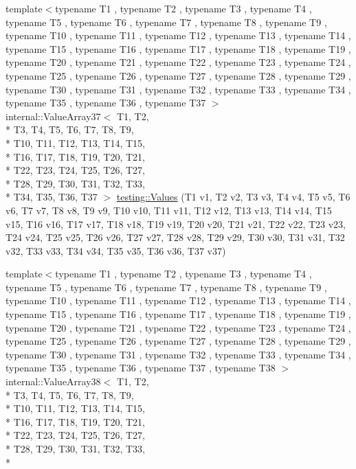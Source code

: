 \begin{DoxyCompactItemize}
\item 
{\footnotesize template$<$typename T1 , typename T2 , typename T3 , typename T4 , typename T5 , typename T6 , typename T7 , typename T8 , typename T9 , typename T10 , typename T11 , typename T12 , typename T13 , typename T14 , typename T15 , typename T16 , typename T17 , typename T18 , typename T19 , typename T20 , typename T21 , typename T22 , typename T23 , typename T24 , typename T25 , typename T26 , typename T27 , typename T28 , typename T29 , typename T30 , typename T31 , typename T32 , typename T33 , typename T34 , typename T35 , typename T36 , typename T37 $>$ }\\internal\-::\-Value\-Array37$<$ T1, T2, \\*
T3, T4, T5, T6, T7, T8, T9, \\*
T10, T11, T12, T13, T14, T15, \\*
T16, T17, T18, T19, T20, T21, \\*
T22, T23, T24, T25, T26, T27, \\*
T28, T29, T30, T31, T32, T33, \\*
T34, T35, T36, T37 $>$ \hyperlink{namespacetesting_aa800bbbe42a44b1776cfd61c9e337ab6}{testing\-::\-Values} (T1 v1, T2 v2, T3 v3, T4 v4, T5 v5, T6 v6, T7 v7, T8 v8, T9 v9, T10 v10, T11 v11, T12 v12, T13 v13, T14 v14, T15 v15, T16 v16, T17 v17, T18 v18, T19 v19, T20 v20, T21 v21, T22 v22, T23 v23, T24 v24, T25 v25, T26 v26, T27 v27, T28 v28, T29 v29, T30 v30, T31 v31, T32 v32, T33 v33, T34 v34, T35 v35, T36 v36, T37 v37)
\item 
{\footnotesize template$<$typename T1 , typename T2 , typename T3 , typename T4 , typename T5 , typename T6 , typename T7 , typename T8 , typename T9 , typename T10 , typename T11 , typename T12 , typename T13 , typename T14 , typename T15 , typename T16 , typename T17 , typename T18 , typename T19 , typename T20 , typename T21 , typename T22 , typename T23 , typename T24 , typename T25 , typename T26 , typename T27 , typename T28 , typename T29 , typename T30 , typename T31 , typename T32 , typename T33 , typename T34 , typename T35 , typename T36 , typename T37 , typename T38 $>$ }\\internal\-::\-Value\-Array38$<$ T1, T2, \\*
T3, T4, T5, T6, T7, T8, T9, \\*
T10, T11, T12, T13, T14, T15, \\*
T16, T17, T18, T19, T20, T21, \\*
T22, T23, T24, T25, T26, T27, \\*
T28, T29, T30, T31, T32, T33, \\*

\end{DoxyCompactItemize}
